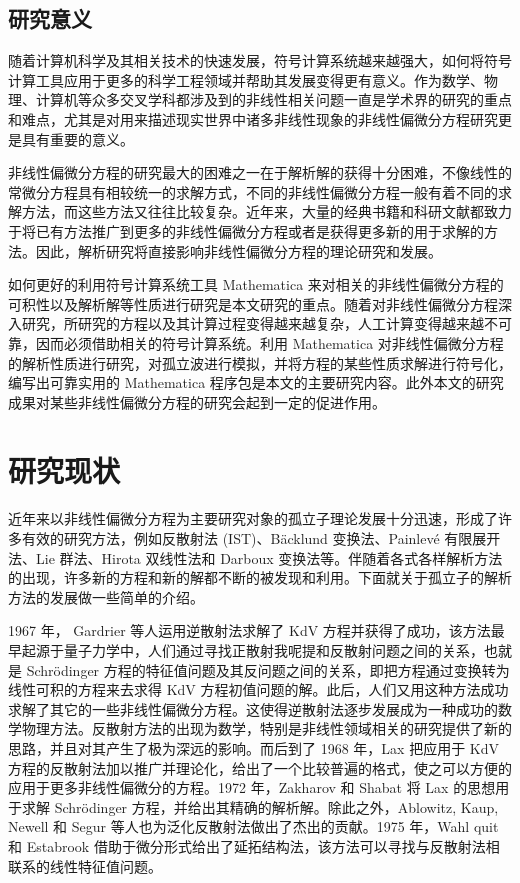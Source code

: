 \subsection{研究意义}
随着计算机科学及其相关技术的快速发展，符号计算系统越来越强大，如何将符号计算工具应用于更多的科学工程领域并帮助其发展变得更有意义。作为数学、物理、计算机等众多交叉学科都涉及到的非线性相关问题一直是学术界的研究的重点和难点，尤其是对用来描述现实世界中诸多非线性现象的非线性偏微分方程研究更是具有重要的意义。

非线性偏微分方程的研究最大的困难之一在于解析解的获得十分困难，不像线性的常微分方程具有相较统一的求解方式，不同的非线性偏微分方程一般有着不同的求解方法，而这些方法又往往比较复杂。近年来，大量的经典书籍和科研文献都致力于将已有方法推广到更多的非线性偏微分方程或者是获得更多新的用于求解的方法。因此，解析研究将直接影响非线性偏微分方程的理论研究和发展。

如何更好的利用符号计算系统工具 Mathematica 来对相关的非线性偏微分方程的可积性以及解析解等性质进行研究是本文研究的重点。随着对非线性偏微分方程深入研究，所研究的方程以及其计算过程变得越来越复杂，人工计算变得越来越不可靠，因而必须借助相关的符号计算系统。利用 Mathematica 对非线性偏微分方程的解析性质进行研究，对孤立波进行模拟，并将方程的某些性质求解进行符号化，编写出可靠实用的 Mathematica 程序包是本文的主要研究内容。此外本文的研究成果对某些非线性偏微分方程的研究会起到一定的促进作用。


\section{研究现状}
近年来以非线性偏微分方程为主要研究对象的孤立子理论发展十分迅速，形成了许多有效的研究方法，例如反散射法 (IST)、B\"{a}cklund 变换法、Painlev\'{e} 有限展开法、Lie 群法、Hirota 双线性法和 Darboux 变换法等。伴随着各式各样解析方法的出现，许多新的方程和新的解都不断的被发现和利用。下面就关于孤立子的解析方法的发展做一些简单的介绍。

1967 年， Gardrier 等人运用逆散射法求解了 KdV 方程并获得了成功，该方法最早起源于量子力学中，人们通过寻找正散射我呢提和反散射问题之间的关系，也就是 Schr\"{o}dinger 方程的特征值问题及其反问题之间的关系，即把方程通过变换转为线性可积的方程来去求得 KdV 方程初值问题的解。此后，人们又用这种方法成功求解了其它的一些非线性偏微分方程。这使得逆散射法逐步发展成为一种成功的数学物理方法。反散射方法的出现为数学，特别是非线性领域相关的研究提供了新的思路，并且对其产生了极为深远的影响。而后到了 1968 年，Lax 把应用于 KdV 方程的反散射法加以推广并理论化，给出了一个比较普遍的格式，使之可以方便的应用于更多非线性偏微分的方程。1972 年，Zakharov 和 Shabat 将 Lax 的思想用于求解 Schr\"{o}dinger 方程，并给出其精确的解析解。除此之外，Ablowitz, Kaup, Newell 和 Segur 等人也为泛化反散射法做出了杰出的贡献。1975 年，Wahl quit 和 Estabrook 借助于微分形式给出了延拓结构法，该方法可以寻找与反散射法相联系的线性特征值问题。

